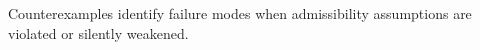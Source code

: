 Counterexamples identify failure modes when admissibility assumptions are violated or silently weakened.
